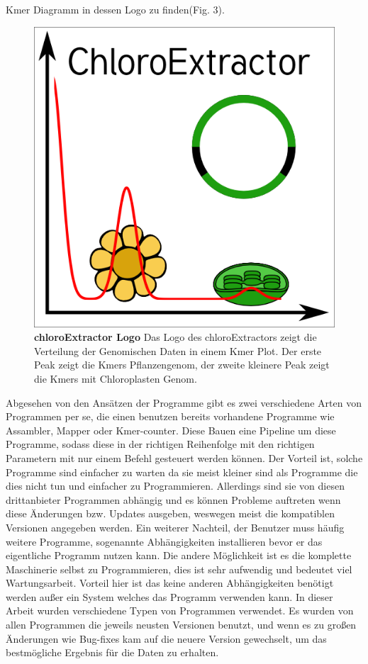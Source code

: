 \documentclass{scrartcl}
\begin{document}
Kmer Diagramm in dessen Logo zu finden(Fig. 3).
\begin{figure}
\includegraphics[width=.6\linewidth]{./logo512.png}
\caption[chloroExtractors Logo]{\textbf{chloroExtractor Logo} Das Logo des chloroExtractors zeigt die Verteilung der Genomischen Daten in einem Kmer Plot. Der erste Peak zeigt die Kmers Pflanzengenom, der zweite kleinere Peak zeigt die Kmers mit Chloroplasten Genom.}
\end{figure}
Abgesehen von den Ansätzen der Programme gibt es zwei verschiedene Arten von Programmen per se, die einen benutzen bereits vorhandene Programme wie Assambler, Mapper oder Kmer-counter. Diese 
Bauen eine Pipeline um diese Programme, sodass diese in der richtigen Reihenfolge mit den richtigen Parametern mit nur einem Befehl gesteuert werden können. Der Vorteil ist, solche Programme
sind einfacher zu warten da sie meist kleiner sind als Programme die dies nicht tun und einfacher zu Programmieren. Allerdings sind sie von diesen drittanbieter Programmen abhängig und es können Probleme 
auftreten wenn diese Änderungen bzw. Updates ausgeben, weswegen meist die kompatiblen Versionen angegeben werden. Ein weiterer Nachteil, der Benutzer muss häufig weitere Programme, sogenannte Abhängigkeiten installieren
bevor er das eigentliche Programm nutzen kann. Die andere Möglichkeit ist es die komplette Maschinerie selbst zu Programmieren, dies ist sehr aufwendig und bedeutet viel Wartungsarbeit. Vorteil hier
ist das keine anderen Abhängigkeiten benötigt werden außer ein System welches das Programm verwenden kann. In dieser Arbeit wurden verschiedene Typen von Programmen verwendet.
Es wurden von allen Programmen die jeweils neusten Versionen benutzt, und wenn es zu großen Änderungen wie Bug-fixes kam auf die neuere Version gewechselt, um das bestmögliche Ergebnis für die Daten
zu erhalten.
\end{document}
